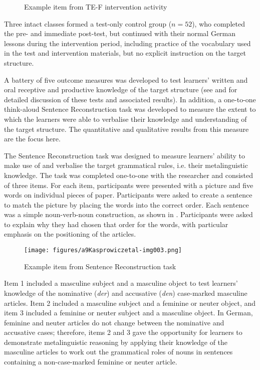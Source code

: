 \documentclass[output=paper]{langscibook}
\begin{document}
  
\begin{figure}
\caption{\label{fig:kasprowicz:2}Example item from TE-F intervention activity}
\end{figure}



Three intact classes formed a test-only control group ($n = 52$), who completed the pre- and immediate post-test, but continued with their normal German lessons during the intervention period, including practice of the vocabulary used in the test and intervention materials, but no explicit instruction on the target structure. 

A battery of five outcome measures was developed to test learners’ written and oral receptive and productive knowledge of the target structure (see \citealt{Hanan2015} and \citealt{KasprowiczMarsden2018} for detailed discussion of these tests and associated results). In addition, a one-to-one think-aloud Sentence Reconstruction task was developed to measure the extent to which the learners were able to verbalise their knowledge and understanding of the target structure. The quantitative and qualitative results from this measure are the focus here.

The Sentence Reconstruction task was designed to measure learners’ ability to make use of and verbalise the target grammatical rules, i.e. their metalinguistic knowledge. The task was completed one-to-one with the researcher and consisted of three items. For each item, participants were presented with a picture and five words on individual pieces of paper. Participants were asked to create a sentence to match the picture by placing the words into the correct order. Each sentence was a simple noun-verb-noun construction, as shown in . Participants were asked to explain why they had chosen that order for the words, with particular emphasis on the positioning of the articles.
  
\begin{figure}
\texttt{[image: figures/a9Kasprowiczetal-img003.png]}
\caption{\label{fig:kasprowicz:3}Example item from Sentence Reconstruction task}
\end{figure}

Item 1 included a masculine subject and a masculine object to test learners’ knowledge of the nominative (\textit{der}) and accusative (\textit{den}) case-marked masculine articles. Item 2 included a masculine subject and a feminine or neuter object, and item 3 included a feminine or neuter subject and a masculine object. In German, feminine and neuter articles do not change between the nominative and accusative cases; therefore, items 2 and 3 gave the opportunity for learners to demonstrate metalinguistic reasoning by applying their knowledge of the masculine articles to work out the grammatical roles of nouns in sentences containing a non-case-marked feminine or neuter article.
\end{document}
